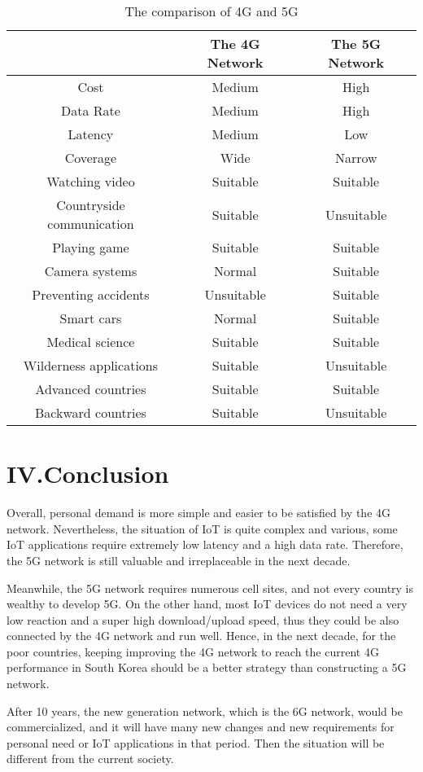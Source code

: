 \documentclass[conference]{IEEEtran}
\begin{document}
\begin{table}[hb!]
    \centering
    \begin{tabular}{|c|c|c|}
        \hline
          & The 4G Network & The 5G Network\\
        \hline
         Cost & Medium & High \\
        \hline
        Data Rate & Medium & High \\
        \hline
        Latency & Medium & Low \\
        \hline
        Coverage & Wide & Narrow \\
        \hline
        Watching video & Suitable & Suitable \\
        \hline
        Countryside communication & Suitable & Unsuitable \\
        \hline
        Playing game & Suitable & Suitable \\
        \hline
        Camera systems & Normal & Suitable \\
        \hline
        Preventing accidents & Unsuitable & Suitable \\
        \hline
        Smart cars & Normal & Suitable \\
        \hline
        Medical science & Suitable & Suitable \\
        \hline
        Wilderness applications & Suitable & Unsuitable \\
        \hline
        Advanced countries & Suitable & Suitable \\
        \hline
        Backward countries & Suitable & Unsuitable \\
        \hline
    \end{tabular}
    \caption{The comparison of 4G and 5G}
    \label{tab:table1}
\end{table}

\section{IV.Conclusion}
Overall, personal demand is more simple and easier to be satisfied by the 4G network. Nevertheless, the situation of IoT is quite complex and various, some IoT applications require extremely low latency and a high data rate. Therefore, the 5G network is still valuable and irreplaceable in the next decade.

Meanwhile, the 5G network requires numerous cell sites, and not every country is wealthy to develop 5G. On the other hand, most IoT devices do not need a very low reaction and a super high download/upload speed, thus they could be also connected by the 4G network and run well. Hence, in the next decade, for the poor countries, keeping improving the 4G network to reach the current 4G performance in South Korea should be a better strategy than constructing a 5G network.

After 10 years, the new generation network, which is the 6G network, would be commercialized, and it will have many new changes and new requirements for personal need or IoT applications in that period. Then the situation will be different from the current society.



\end{document}
